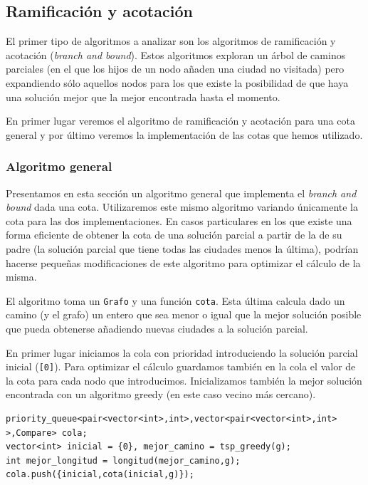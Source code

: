 \subsection{Ramificación y acotación}

El primer tipo de algoritmos a analizar son los algoritmos de ramificación y acotación
(\textit{branch and bound}). Estos algoritmos exploran un árbol de caminos parciales (en el que los hijos de un nodo añaden una ciudad no visitada) pero expandiendo sólo aquellos nodos para los que existe la posibilidad de que haya una solución mejor que la mejor
encontrada hasta el momento.

En primer lugar veremos el algoritmo de ramificación y acotación para una cota general y por último veremos la implementación de las cotas que hemos utilizado.

\subsubsection{Algoritmo general}

Presentamos en esta sección un algoritmo general que implementa el \textit{branch and bound} dada una cota. Utilizaremos este mismo algoritmo variando únicamente la cota para las dos implementaciones. En casos particulares en los que existe una forma eficiente de obtener la cota de una solución parcial a partir de la de su padre (la solución parcial que tiene todas las ciudades menos la última), podrían hacerse pequeñas modificaciones de este algoritmo para optimizar el cálculo de la misma.

El algoritmo toma un \texttt{Grafo} y una función \texttt{cota}. Esta última calcula dado un camino (y el grafo) un entero que sea menor o igual que la mejor solución posible que pueda obtenerse añadiendo nuevas ciudades a la solución parcial.

En primer lugar iniciamos la cola con prioridad introduciendo la solución parcial
inicial (\texttt{[0]}). Para optimizar el cálculo guardamos también en la cola el valor de la cota para cada nodo que introducimos. Inicializamos también la mejor solución encontrada con un algoritmo greedy (en este caso vecino más cercano).

\begin{lstlisting}
priority_queue<pair<vector<int>,int>,vector<pair<vector<int>,int> >,Compare> cola;
vector<int> inicial = {0}, mejor_camino = tsp_greedy(g);
int mejor_longitud = longitud(mejor_camino,g);
cola.push({inicial,cota(inicial,g)});
\end{lstlisting}

